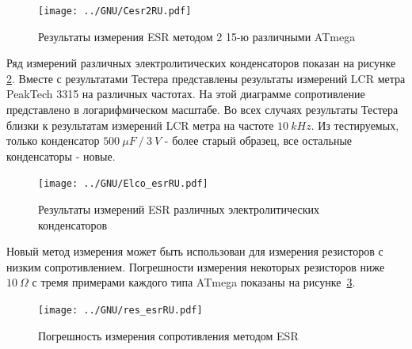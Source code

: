 \begin{figure}[H]
\centering
\texttt{[image: ../GNU/Cesr2RU.pdf]}
\caption{Результаты измерения ESR методом 2 15-ю различными ATmega}
\label{fig:Cesr2}
\end{figure}

Ряд измерений различных электролитических конденсаторов показан на рисунке \ref{fig:ElcoESR}.
Вместе с результатами Тестера представлены результаты измерений LCR метра PeakTech 3315 на различных частотах. На 
этой диаграмме сопротивление представлено в логарифмическом масштабе. Во всех случаях результаты Тестера близки к 
результатам измерений LCR метра на частоте \(10~kHz\). Из тестируемых, только конденсатор \(500~\mu F~/~3~V\) - более 
старый образец, все остальные конденсаторы - новые.

\begin{figure}[H]
\centering
\texttt{[image: ../GNU/Elco\_esrRU.pdf]}
\caption{Результаты измерений ESR различных электролитических конденсаторов}
\label{fig:ElcoESR}
\end{figure}


Новый метод измерения может быть использован для измерения резисторов с низким сопротивлением. Погрешности измерения 
некоторых резисторов ниже \(10~\Omega\) с тремя примерами каждого типа ATmega показаны на рисунке~\ref{fig:res_esr}. 

\begin{figure}[H]
\centering
\texttt{[image: ../GNU/res\_esrRU.pdf]}
\caption{Погрешность измерения сопротивления методом ESR}
\label{fig:res_esr}
\end{figure}

